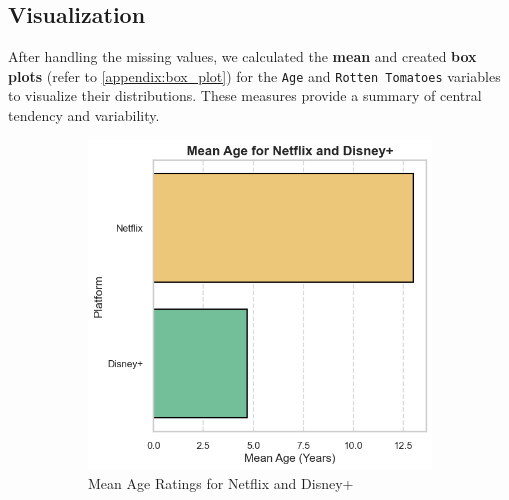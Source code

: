 \documentclass[a4paper, 12pt]{article}
\begin{document}
\subsection{Visualization}

After handling the missing values, we calculated the \textbf{mean} and created \textbf{box plots} (refer to \autoref{appendix:box_plot}) for the \texttt{Age} and \texttt{Rotten Tomatoes} variables to visualize their distributions. These measures provide a summary of central tendency and variability.

\begin{figure}[H]
    \centering
    \begin{subfigure}[t]{0.48\textwidth}
        \centering
        \includegraphics[width=\textwidth]{mean_age.png}
        \caption{Mean Age Ratings for Netflix and Disney+}
        \label{fig:mean_age}
    \end{subfigure}
    \hfill
    \begin{subfigure}[t]{0.48\textwidth}
        \centering

\end{subfigure}
\end{figure}
\end{document}
